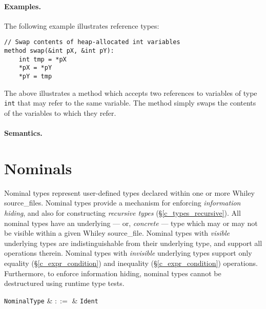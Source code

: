 \paragraph{Examples.} The following example illustrates reference types:
\begin{lstlisting}
// Swap contents of heap-allocated int variables
method swap(&int pX, &int pY):
    int tmp = *pX
    *pX = *pY
    *pY = tmp
\end{lstlisting} 

The above illustrates a method which accepts two references to variables of type \lstinline{int} that may refer to the same variable.  The method simply swaps the contents of the variables to which they refer.

\paragraph{Semantics.}


\section{Nominals}
\label{c_types_nominal}

Nominal types represent user-defined types declared within one or more Whiley \gls{source_file}s.  Nominal types provide a mechanism for enforcing {\em information hiding}, and also for constructing {\em recursive types} (\S\ref{c_types_recursive}).  All nominal types have an underlying --- or, {\em concrete} --- type which may or may not be visible within a given Whiley \gls{source_file}.  Nominal types with {\em visible} underlying types are indistinguishable from their underlying type, and support all operations therein.   Nominal types with {\em invisible} underlying types support only equality (\S\ref{c_expr_condition}) and inequality (\S\ref{c_expr_condition}) operations.  Furthermore, to enforce information hiding, nominal types cannot be destructured using runtime type tests.

\begin{syntax}
  \verb+NominalType+ & $::=$ & \verb+Ident+\\
\end{syntax}

